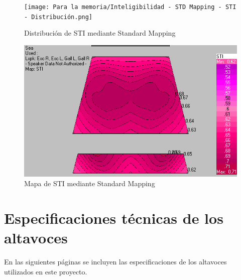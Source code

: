 \documentclass{article}
\begin{document}
\begin{figure}
    \centering
    \texttt{[image: Para la memoria/Inteligibilidad - STD Mapping - STI - Distribución.png]}
    \caption{Distribución de STI mediante Standard Mapping}
    \label{fig:STI}
\end{figure}
\begin{figure}
    \centering
    \includegraphics[width=\linewidth]{Para la memoria/Inteligibilidad - STD Mapping - STI - Mapa.png}
    \caption{Mapa de STI mediante Standard Mapping}
    \label{fig:STI}
\end{figure}

%
%


\newpage
\appendix
\section{Especificaciones técnicas de los altavoces} \label{app:specs}

En las siguientes páginas se incluyen las especificaciones de los altavoces utilizados en este proyecto.




\end{document}
